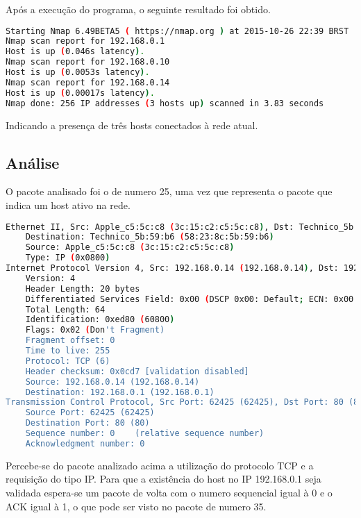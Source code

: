 \documentclass[a4paper]{report} %
\begin{document}
Após a execução do programa, o seguinte resultado foi obtido.

\begin{lstlisting}[language=bash]
Starting Nmap 6.49BETA5 ( https://nmap.org ) at 2015-10-26 22:39 BRST
Nmap scan report for 192.168.0.1
Host is up (0.046s latency).
Nmap scan report for 192.168.0.10
Host is up (0.0053s latency).
Nmap scan report for 192.168.0.14
Host is up (0.00017s latency).
Nmap done: 256 IP addresses (3 hosts up) scanned in 3.83 seconds
\end{lstlisting}

Indicando a presença de três hosts conectados à rede atual.

\subsection{Análise}
\label{sub_nmap_analise}

O pacote analisado foi o de numero 25, uma vez que representa o pacote que indica um host ativo na rede.

\begin{lstlisting}[language=bash]
Ethernet II, Src: Apple_c5:5c:c8 (3c:15:c2:c5:5c:c8), Dst: Technico_5b:59:b6 (58:23:8c:5b:59:b6)
    Destination: Technico_5b:59:b6 (58:23:8c:5b:59:b6)
    Source: Apple_c5:5c:c8 (3c:15:c2:c5:5c:c8)
    Type: IP (0x0800)
Internet Protocol Version 4, Src: 192.168.0.14 (192.168.0.14), Dst: 192.168.0.1 (192.168.0.1)
    Version: 4
    Header Length: 20 bytes
    Differentiated Services Field: 0x00 (DSCP 0x00: Default; ECN: 0x00: Not-ECT (Not ECN-Capable Transport))
    Total Length: 64
    Identification: 0xed80 (60800)
    Flags: 0x02 (Don't Fragment)
    Fragment offset: 0
    Time to live: 255
    Protocol: TCP (6)
    Header checksum: 0x0cd7 [validation disabled]
    Source: 192.168.0.14 (192.168.0.14)
    Destination: 192.168.0.1 (192.168.0.1)
Transmission Control Protocol, Src Port: 62425 (62425), Dst Port: 80 (80), Seq: 0, Len: 0
    Source Port: 62425 (62425)
    Destination Port: 80 (80)
    Sequence number: 0    (relative sequence number)
    Acknowledgment number: 0
\end{lstlisting}

Percebe-se do pacote analizado acima a utilização do protocolo TCP e a requisição do tipo IP. Para que a existência do host no IP 192.168.0.1 seja validada espera-se um pacote de volta com o numero sequencial igual à 0 e o ACK igual à 1, o que pode ser visto no pacote de numero 35.
\end{document}
